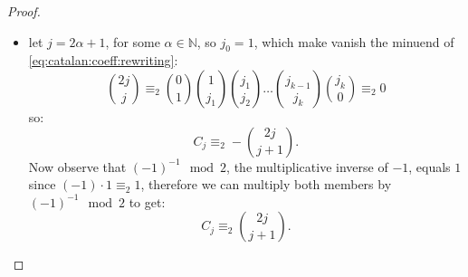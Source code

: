 \begin{proof}
\begin{itemize}
    \item let $j=2\alpha+1$, for some $\alpha\in\mathbb{N}$, so $j_{0}=1$,
        which make vanish the minuend of \autoref{eq:catalan:coeff:rewriting}:
        \begin{displaymath}
            {{2j}\choose{j}}
            \equiv_{2} {{0}\choose{1}}{{1}\choose{j_{1}}}{{j_{1}}\choose{j_{2}}}
                \ldots{{j_{k-1}}\choose{j_{k}}}{{j_{k}}\choose{0}}\equiv_{2}0
        \end{displaymath}
        so:
        \begin{displaymath}
            C_{j}\equiv_{2}-{{2j}\choose{j+1}}.
        \end{displaymath}
        Now observe that $(-1)^{-1}\mod2$, the multiplicative inverse of $-1$, equals $1$
        since $(-1)\cdot 1 \equiv_{2}1$, therefore we can multiply both members by
        $(-1)^{-1}\mod2$ to get:
        \begin{displaymath}
            C_{j}\equiv_{2}{{2j}\choose{j+1}}.
        \end{displaymath}


\end{itemize}
\end{proof}
